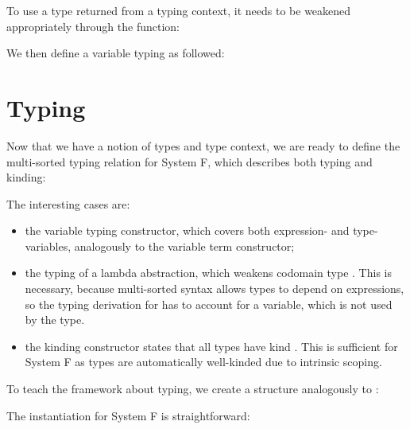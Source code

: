 \documentclass[a4paper, UKenglish, cleveref, autoref, thm-restate]{lipics-v2021}
\newenvironment{LibCode*}{%
  \begin{tcolorbox}[%
    colframe=white,%
    boxrule=0.0pt,%
    top=2.5pt,%
    left=2.5pt,%
    bottom=2.5pt,%
    right=2.5pt,%
    before skip=5pt,%
    after skip=5pt,%
    boxsep=0pt%
  ]
}{%
  \end{tcolorbox}%
}
\newcommand*\LibCode[1]{\begin{LibCode*}{#1}\end{LibCode*}}
\newcommand*\AppCode[1]{{#1}}
\newcommand*\ACode[1]{\AgdaFontStyle{\textcolor{mygray}{#1}}}
\newcommand*\ACon[1]{\AgdaInductiveConstructor{#1}}
\newcommand*\ADef[1]{\AgdaFunction{#1}}
\begin{document}
  To use a type returned from a typing context, it needs to be
  weakened appropriately through the \ACode{\ADef{wk-telescope}} function:

  \noindent
  \begin{minipage}[t]{1.0\linewidth}
    \begin{minipage}[t]{0.45\linewidth}
      \LibCode\KContextLookupII
    \end{minipage}
    \begin{minipage}[t]{0.55\linewidth}
      \LibCode\KContextLookupI
    \end{minipage}
  \end{minipage}

  We then define a variable typing as followed:
  \LibCode\KVariableTyping

  \section{Typing}
  \label{sec:typing}
  Now that we have a notion of types and type context, we are ready to define
  the multi-sorted typing relation for System F, which describes both
  typing and kinding:
  \AppCode\FTyping


  The interesting cases are:
  \begin{itemize}
  \item
    the variable typing constructor, which covers both expression- and
    type-variables, analogously to the variable term constructor;
  \item
    the typing \ACode{\ACon{⊢λ}} of a lambda abstraction, which
    weakens codomain type \ACode{t₂}.
    This is necessary, because multi-sorted syntax allows types
    to depend on expressions, so the typing derivation for \ACode{e}
    has to account for a variable, which is not used by the type.
  \item
    the kinding constructor \ACode{\ACon{⊢τ}} states that all types
    have kind \ACode{\ACon{★}}. This is sufficient for System F as types
    are automatically well-kinded due to intrinsic scoping.
  \end{itemize}
  To teach the framework about typing, we create a structure analogously to
  \ACode{\ACon{Syntax}}:
  \LibCode\KTyping
  The instantiation for System F is straightforward:
  \AppCode\FTypingInst
\end{document}

